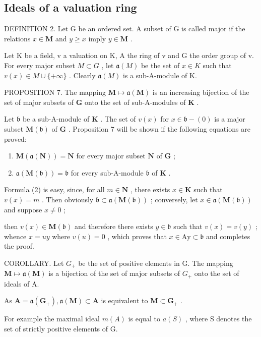 \subsection{Ideals of a valuation ring}

DEFINITION 2. Let G be an ordered set. A subset of G is called major if the relations \(x \in \mathbf{M}\) and \(y \geqslant x\) imply \(y \in \mathbf{M}\) .

Let K be a field, v a valuation on K, A the ring of v and G the order group of v. For every major subset \(M \subset G\) , let \(\mathfrak{a}(M)\) be the set of \(x \in K\) such that \(v(x) \in M \cup \{+\infty\}\) . Clearly \(\mathfrak{a}(M)\) is a sub-A-module of K.

PROPOSITION 7. The mapping \(\mathbf{M} \mapsto \mathfrak{a}(\mathbf{M})\) is an increasing bijection of the set of major subsets of \(\mathbf{G}\) onto the set of sub-A-modules of \(\mathbf{K}\) .

Let \(\mathfrak{b}\) be a sub-A-module of \(\mathbf{K}\) . The set of \(v(x)\) for \(x \in \mathfrak{b} - (0)\) is a major subset \(\mathbf{M}(\mathfrak{b})\) of \(\mathbf{G}\) . Proposition 7 will be shown if the following equations are proved:

\begin{enumerate}
\def\labelenumi{(\arabic{enumi})}
\setcounter{enumi}{1}
\item
  \(\mathbf{M}(\mathfrak{a}(\mathbf{N})) = \mathbf{N}\) for every major subset \(\mathbf{N}\) of \(\mathbf{G}\) ;
\item
  \(\mathfrak{a}(\mathbf{M}(\mathfrak{b})) = \mathfrak{b}\) for every sub-A-module \(\mathfrak{b}\) of \(\mathbf{K}\) .
\end{enumerate}

Formula (2) is easy, since, for all \(m \in \mathbf{N}\) , there exists \(x \in \mathbf{K}\) such that \(v(x) = m\) . Then obviously \(\mathfrak{b} \subset \mathfrak{a}(\mathbf{M}(\mathfrak{b}))\) ; conversely, let \(x \in \mathfrak{a}(\mathbf{M}(\mathfrak{b}))\) and suppose \(x \neq 0\) ;

then \(v(x) \in \mathbf{M}(\mathfrak{b})\) and therefore there exists \(y \in \mathfrak{b}\) such that \(v(x) = v(y)\) ; whence \(x = uy\) where \(v(u) = 0\) , which proves that \(x \in \mathrm{Ay} \subset \mathfrak{b}\) and completes the proof.

COROLLARY. Let \(G_{+}\) be the set of positive elements in G. The mapping \(\mathbf{M} \mapsto \mathfrak{a}(\mathbf{M})\) is a bijection of the set of major subsets of \(G_{+}\) onto the set of ideals of A.

As \(\mathbf{A} = \mathfrak{a}(\mathbf{G}_{+}),\mathfrak{a}(\mathbf{M})\subset \mathbf{A}\) is equivalent to \(\mathbf{M}\subset \mathbf{G}_{+}\) .

For example the maximal ideal \(m(A)\) is equal to \(a(S)\) , where S denotes the set of strictly positive elements of G.
\relax{}

